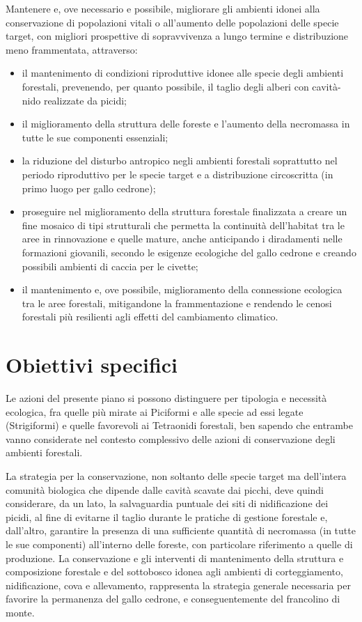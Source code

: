 \documentclass[10pt,twoside,openany,x11names,svgnames,italian,a5paper,dvipsnames,table]{memoir}
\begin{document}
Mantenere e, ove necessario e possibile, migliorare gli ambienti idonei alla conservazione di popolazioni vitali o all'aumento delle popolazioni delle specie target, con migliori prospettive di sopravvivenza a lungo termine e distribuzione meno frammentata, attraverso:
\begin{itemize}
  \item il mantenimento di condizioni riproduttive idonee alle specie degli ambienti forestali, prevenendo, per quanto possibile, il taglio degli alberi con cavità-nido realizzate da picidi; 
  \item il miglioramento della struttura delle foreste e l’aumento della necromassa in tutte le sue componenti essenziali;
  \item la riduzione del disturbo antropico negli ambienti forestali soprattutto nel periodo riproduttivo per le specie target e a distribuzione circoscritta (in primo luogo per gallo cedrone);
  \item proseguire nel miglioramento della struttura forestale finalizzata a creare un fine mosaico di tipi strutturali che permetta la continuità dell’habitat tra le aree in rinnovazione e quelle mature, anche anticipando i diradamenti nelle formazioni giovanili, secondo le esigenze ecologiche del gallo cedrone e creando possibili ambienti di caccia per le civette; 
  \item il mantenimento e, ove possibile, miglioramento della connessione ecologica tra le aree forestali, mitigandone la frammentazione e rendendo le cenosi forestali più resilienti agli effetti del cambiamento climatico.
\end{itemize}

\section{Obiettivi specifici}
Le azioni del presente piano si possono distinguere per tipologia e necessità ecologica, fra quelle più mirate ai Piciformi e alle specie ad essi legate (Strigiformi) e quelle favorevoli ai Tetraonidi forestali, ben sapendo che entrambe vanno considerate nel contesto complessivo delle azioni di conservazione degli ambienti forestali.

La strategia per la conservazione, non soltanto delle specie target ma dell’intera comunità biologica che dipende dalle cavità scavate dai picchi, deve quindi considerare, da un lato, la salvaguardia puntuale dei siti di nidificazione dei picidi, al fine di evitarne il taglio durante le pratiche di gestione forestale e, dall’altro, garantire la presenza di una sufficiente quantità di necromassa (in tutte le sue componenti) all’interno delle foreste, con particolare riferimento a quelle di produzione. La conservazione e gli interventi di mantenimento della struttura e composizione forestale e del sottobosco idonea agli ambienti di corteggiamento, nidificazione, cova e allevamento, rappresenta la strategia generale necessaria per favorire la permanenza del gallo cedrone, e conseguentemente del francolino di monte.
\end{document}
